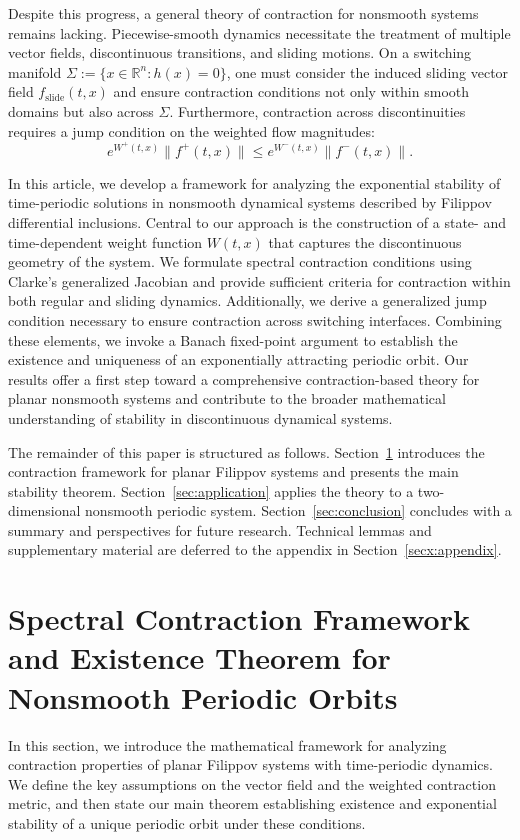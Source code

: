 \documentclass[11pt]{article}
\begin{document}
Despite this progress, a general theory of contraction for nonsmooth systems remains lacking. Piecewise-smooth dynamics necessitate the treatment of multiple vector fields, discontinuous transitions, and sliding motions. On a switching manifold $\Sigma := \{ x \in \mathbb{R}^n : h(x) = 0 \}$, one must consider the induced sliding vector field $f_{\mathrm{slide}}(t,x)$ and ensure contraction conditions not only within smooth domains but also across $\Sigma$. Furthermore, contraction across discontinuities requires a jump condition on the weighted flow magnitudes:
\[
e^{W^+(t,x)} \|f^+(t,x)\| \leq e^{W^-(t,x)} \|f^-(t,x)\|.
\]

In this article, we develop a framework for analyzing the exponential stability of time-periodic solutions in nonsmooth dynamical systems described by Filippov differential inclusions. Central to our approach is the construction of a state- and time-dependent weight function $W(t,x)$ that captures the discontinuous geometry of the system. We formulate spectral contraction conditions using Clarke's generalized Jacobian and provide sufficient criteria for contraction within both regular and sliding dynamics. Additionally, we derive a generalized jump condition necessary to ensure contraction across switching interfaces. Combining these elements, we invoke a Banach fixed-point argument to establish the existence and uniqueness of an exponentially attracting periodic orbit. Our results offer a first step toward a comprehensive contraction-based theory for planar nonsmooth systems and contribute to the broader mathematical understanding of stability in discontinuous dynamical systems.

The remainder of this paper is structured as follows. Section~\ref{sec:framework} introduces the contraction framework for planar Filippov systems and presents the main stability theorem. Section~\ref{sec:application} applies the theory to a two-dimensional nonsmooth periodic system. Section~\ref{sec:conclusion} concludes with a summary and perspectives for future research. Technical lemmas and supplementary material are deferred to the appendix in Section~\ref{secx:appendix}.


\section{Spectral Contraction Framework and Existence Theorem for Nonsmooth Periodic Orbits}
\label{sec:framework}

In this section, we introduce the mathematical framework for analyzing contraction properties of planar Filippov systems with time-periodic dynamics. We define the key assumptions on the vector field and the weighted contraction metric, and then state our main theorem establishing existence and exponential stability of a unique periodic orbit under these conditions.
	
\end{document}
